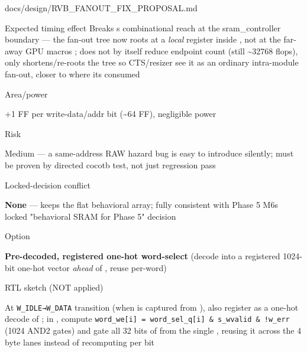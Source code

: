 \begin{relocated}{docs/design/RVB_FANOUT_FIX_PROPOSAL.md}
\begin{rowtable}
\begin{rowcell}{Expected timing effect}
Breaks \textquotesingle s combinational reach at the
sram\_\allowbreak{}controller boundary --- the fan-out tree now roots at
a \emph{local} register inside , not at the
far-away GPU macro\textquotesingle s ; does not by
itself reduce endpoint count (still \textasciitilde32768 flops), only
shortens/\allowbreak{}re-roots the tree so CTS/\allowbreak{}resizer see
it as an ordinary intra-module fan-out, closer to where
it\textquotesingle s consumed

\end{rowcell}

\begin{rowcell}{Area/\allowbreak{}power}

+1 FF per write-data/\allowbreak{}addr bit (\textasciitilde64 FF),
negligible power

\end{rowcell}

\begin{rowcell}{Risk}

Medium --- a same-address RAW hazard bug is easy to introduce silently;
must be proven by directed cocotb test, not just regression pass

\end{rowcell}

\begin{rowcell}{Locked-decision conflict}

\textbf{None} --- keeps the flat behavioral array; fully consistent with
Phase 5 M6\textquotesingle s locked "behavioral SRAM for Phase 5"
decision

\end{rowcell}


\begin{rowcell}{Option}

\textbf{Pre-decoded, registered one-hot word-select} (decode
 into a registered 1024-bit one-hot vector \emph{ahead} of
, reuse per-word)

\end{rowcell}

\begin{rowcell}{RTL sketch (NOT applied)}

At \texttt{W\_\allowbreak{}IDLE→W\_\allowbreak{}DATA} transition (when
 is captured from ), also register
 as a one-hot decode of ; in
, compute
\texttt{word\_\allowbreak{}we[i]\ =\allowbreak{}\ word\_\allowbreak{}sel\_\allowbreak{}q[i]\ \&\ s\_\allowbreak{}wvalid\ \&\ !w\_\allowbreak{}err}
(1024 AND2 gates) and gate all 32 bits of  from the single
, reusing it across the 4 byte lanes instead of
recomputing  per bit


\end{rowcell}
\end{rowtable}
\end{relocated}

